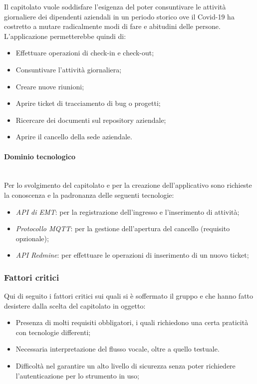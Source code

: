 \documentclass[11pt]{article}
\begin{document}
		\noindent
        Il capitolato vuole soddisfare l'esigenza del poter consuntivare le attività giornaliere dei dipendenti aziendali in un
        periodo storico ove il Covid-19 ha costretto a mutare radicalmente modi di fare e abitudini delle persone.
        L'applicazione permetterebbe quindi di:
		\begin{itemize}
			\item Effettuare operazioni di check-in e check-out;
			\item Consuntivare l'attività giornaliera;
			\item Creare nuove riunioni;
			\item Aprire ticket di tracciamento di bug o progetti;
			\item Ricercare dei documenti sul repository aziendale;
			\item Aprire il cancello della sede aziendale.			
		\end{itemize}		        
		
        \paragraph{Dominio tecnologico}~\\
        
        \noindent
        Per lo svolgimento del capitolato e per la creazione dell'applicativo sono richieste la conoscenza e la padronanza
        delle seguenti tecnologie:
        \begin{itemize}
            \item \textit{API di EMT}: per la registrazione dell'ingresso e l'inserimento di attività;
            \item \textit{Protocollo MQTT}: per la gestione dell'apertura del cancello (requisito opzionale);
            \item \textit{API Redmine}: per effettuare le operazioni di inserimento di un nuovo ticket;
        \end{itemize}
    
    \subsubsection{Fattori critici}
    Qui di seguito i fattori critici sui quali si è soffermato il gruppo e che hanno fatto desistere dalla scelta del capitolato in
    oggetto:
    	\begin{itemize}
            \item Presenza di molti requisiti obbligatori, i quali richiedono una certa praticità con tecnologie differenti;
            \item Necessaria interpretazione del flusso vocale, oltre a quello testuale.
            \item Difficoltà nel garantire un alto livello di sicurezza senza poter richiedere l'autenticazione per lo strumento in uso;
        \end{itemize}
        
\end{document}
